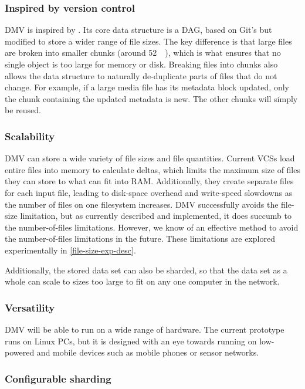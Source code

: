 \subsubsection{Inspired by version control}

\gls{DMV} is inspired by . Its core data structure is
a \gls{DAG}, based on Git's but modified to store a wider range of file sizes.
The key difference is that large files are broken into smaller chunks (around
\SI{52}{\kibi\byte}), which is what ensures that no single object is too large
for memory or disk. Breaking files into chunks also allows the data structure to
naturally de-duplicate parts of files that do not change. For example, if a
large media file has its metadata block updated, only the chunk containing the
updated metadata is new. The other chunks will simply be reused.


\subsubsection{Scalability}

\gls{DMV} can store a wide variety of file sizes and file quantities. Current
\glspl{VCS} load entire files into memory to calculate deltas, which limits the
maximum size of files they can store to what can fit into RAM. Additionally,
they create separate files for each input file, leading to disk-space overhead
and write-speed slowdowns as the number of files on one filesystem increases.
\gls{DMV} successfully avoids the file-size limitation, but as currently
described and implemented, it does succumb to the number-of-files limitations.
However, we know of an effective method to avoid the number-of-files limitations
in the future. These limitations are explored experimentally in
\autoref{file-size-exp-desc}.

Additionally, the stored data set can also be sharded, so that the data set as a
whole can scale to sizes too large to fit on any one computer in the network.


\subsubsection{Versatility}

\gls{DMV} will be able to run on a wide range of hardware. The current prototype
runs on Linux PCs, but it is designed with an eye towards running on low-powered
and mobile devices such as mobile phones or sensor networks.


\subsubsection{Configurable sharding}

